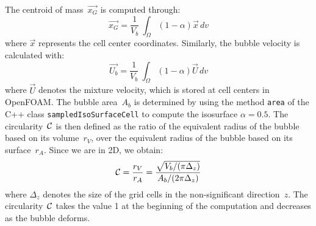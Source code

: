 \documentclass[review]{elsarticle}
\begin{document}
The centroid of mass~$\overrightarrow{x_G}$ is computed through: 
\begin{equation}
  \overrightarrow{x_G} = \frac{1}{V_b}~\int_{\Omega}(1-\alpha)\overrightarrow{x}\,dv
\end{equation}
where $\overrightarrow{x}$ represents the cell center coordinates. Similarly, the bubble velocity is calculated with:
\begin{equation}
  \overrightarrow{U_b} = \frac{1}{V_b}~\int_{\Omega}(1-\alpha)\overrightarrow{U}\,dv
  \label{eqnPPvelocity}
\end{equation}
where $\overrightarrow{U}$ denotes the mixture velocity, which is stored at cell centers in OpenFOAM. The bubble area~$A_b$ is determined by using the method \verb+area+ of the C++ class \verb+sampledIsoSurfaceCell+ to compute the isosurface $\alpha=0.5$. The circularity~$\cal{C}$ is then defined as the ratio of the equivalent radius of the bubble based on its volume~$r_V$, over the equivalent radius of the bubble based on its surface~$r_A$. Since we are in 2D, we obtain: 
\begin{equation}
 {\cal{C}} = \frac{r_V}{r_A} = \frac{\sqrt{V_b/(\pi \Delta_z)}}{ A_b/(2 \pi \Delta_z)} 
\end{equation}
where $\Delta_z$ denotes the size of the grid cells in the non-significant direction~$z$. The circularity~$\cal{C}$ takes the value 1 at the beginning of the computation and decreases as the bubble deforms.
\end{document}
